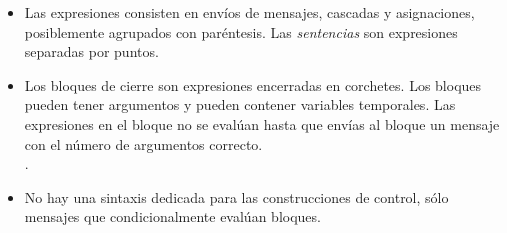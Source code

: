 \documentclass[a4paper,10pt,twoside]{book}
\begin{document}
\begin{itemize}
\item	Las expresiones consisten en envíos de mensajes, cascadas y asignaciones, posiblemente agrupados con paréntesis.
		Las \emph{sentencias} son expresiones separadas por puntos.

\item	Los bloques de cierre son expresiones encerradas en corchetes.
		Los bloques pueden tener argumentos y pueden contener variables temporales.
		Las expresiones en el bloque no se evalúan hasta que envías al bloque un mensaje
		 con el número de argumentos correcto.\\
		.

\item	No hay una sintaxis dedicada para las construcciones de control, sólo mensajes que condicionalmente evalúan bloques.\\

\end{itemize}

\ifx\wholebook\relax\else
\end{document}
